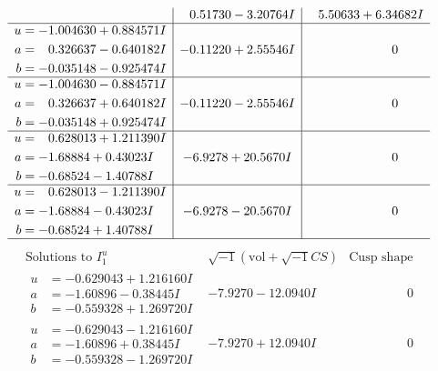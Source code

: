 \documentclass[1p]{elsarticle_modified}
\theoremstyle{definition}
\newcommand{\I}{\sqrt{-1}}
\begin{document}
$$\begin{array}{c|c|c}
 & \phantom{-}0.51730 - 3.20764 I & \phantom{-}5.50633 + 6.34682 I \\ \hline\begin{aligned}
u &= -1.004630 + 0.884571 I \\
a &= \phantom{-}0.326637 - 0.640182 I \\
b &= -0.035148 - 0.925474 I\end{aligned}
 & -0.11220 + 2.55546 I & \phantom{-0.000000 } 0 \\ \hline\begin{aligned}
u &= -1.004630 - 0.884571 I \\
a &= \phantom{-}0.326637 + 0.640182 I \\
b &= -0.035148 + 0.925474 I\end{aligned}
 & -0.11220 - 2.55546 I & \phantom{-0.000000 } 0 \\ \hline\begin{aligned}
u &= \phantom{-}0.628013 + 1.211390 I \\
a &= -1.68884 + 0.43023 I \\
b &= -0.68524 - 1.40788 I\end{aligned}
 & -6.9278 + 20.5670 I & \phantom{-0.000000 } 0 \\ \hline\begin{aligned}
u &= \phantom{-}0.628013 - 1.211390 I \\
a &= -1.68884 - 0.43023 I \\
b &= -0.68524 + 1.40788 I\end{aligned}
 & -6.9278 - 20.5670 I & \phantom{-0.000000 } 0\\
 \hline 
 \end{array}$$\newpage$$\begin{array}{c|c|c}  
\text{Solutions to }I^u_{1}& \I (\text{vol} + \sqrt{-1}CS) & \text{Cusp shape}\\
 \hline 
\begin{aligned}
u &= -0.629043 + 1.216160 I \\
a &= -1.60896 - 0.38445 I \\
b &= -0.559328 + 1.269720 I\end{aligned}
 & -7.9270 - 12.0940 I & \phantom{-0.000000 } 0 \\ \hline\begin{aligned}
u &= -0.629043 - 1.216160 I \\
a &= -1.60896 + 0.38445 I \\
b &= -0.559328 - 1.269720 I\end{aligned}
 & -7.9270 + 12.0940 I & \phantom{-0.000000 } 0 \\ \hline\begin{aligned}

\end{aligned}
\end{array}$$
\end{document}
